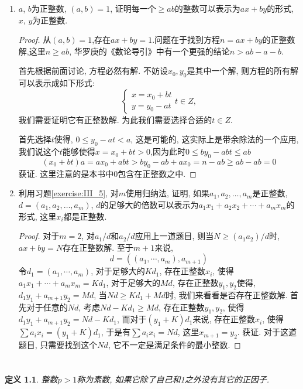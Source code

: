 \documentclass[12pt,a4paper]{book} %
\newtheorem{definition}[theorem]{定义}
\theoremstyle{remark}
\theoremstyle{example}
\theoremstyle{lemma}
\theoremstyle{corollary}
\numberwithin{theorem}{chapter}
\begin{document}
\begin{enumerate}
\item \label{exercise:III_5} $a$, $b$为正整数, $(a, b) = 1$, 证明每一个$\ge ab$的整数可以表示为$ax + by$的形式, $x$, $y$为正整数.

\begin{proof}
从$(a, b) = 1$,存在$ax + by = 1$.问题在于找到方程$n = ax + by$的正整数解,这里$n \ge ab$, 华罗庚的《数论导引》中有一个更强的结论$n > ab - a - b$.

首先根据前面讨论, 方程必然有解. 不妨设$x_0, y_0$是其中一个解, 则方程的所有解可以表示成如下形式:
\[
\left.
\begin{cases}
x = x_0 + bt \\
y = y_0 - at
\end{cases}
\right. t \in Z,
\]
我们需要证明它有正整数解. 为此我们需要选择合适的$t \in Z$.

首先选择$t$使得, $0 \le y_0 - at < a$, 这是可能的, 这实际上是带余除法的一个应用, 我们说这个$t$能够使得$x = x_0 + bt > 0$,因为此时$0 \le by_0 - abt \le ab$
\[
(x_0 + bt)a = ax_0 + abt > by_0 - ab + ax_0 = n - ab \ge ab - ab = 0
\]
获证. 这里注意的是本书中$0$包含在正整数之中.
\end{proof}

\item \label{exercise:III_6} 利用习题\ref{exercise:III_5}, 对$m$使用归纳法, 证明, 如果$a_1, a_2, \ldots, a_m$是正整数, $d = (a_1, a_2, \ldots, a_m)$, $d$的足够大的倍数可以表示为$a_1x_1 + a_2x_2 + \cdots + a_mx_m$的形式, 这里$x_i$都是正整数.
\begin{proof}
对于$m=2$, 对$a_1/d$和$a_2/d$应用上一道题目, 则当$N \ge (a_1a_2)/d$时, $ax + by = N$存在正整数解. 至于$m+1$来说, 
\[
d= ((a_1, \cdots, a_m), a_{m+1})
\]
令$d_1 = (a_1, \cdots, a_m)$, 对于足够大的$Kd_1$, 存在正整数$x_i$, 使得$a_1x_1 + \cdots + a_mx_m = Kd_1$, 对于足够大的$Md$, 存在正整数$y_1, y_2$使得, $d_1y_1 + a_{m+1}y_2 = Md$, 当$Nd \ge Kd_1 + Md$时, 我们来看看是否存在正整数解. 首先对于任意的$Nd$, 考虑$Nd-Kd_1 \ge Md$, 存在正整数$y_1, y_2$, 使得$d_1y_1 + a_{m+1}y_2 = Nd - Kd_1$, 而对于$(y_1 + K)d_1$来说, 存在正整数$x_i$, 使得$\sum{a_ix_i} = (y_1 + K)d_1$, 于是有$\sum{a_ix_i} = Nd$, 这里$x_{m+1} = y_2$. 获证. 对于这道题目, 只需要找到这个$Nd$, 它不一定是满足条件的最小整数.
\end{proof}
\end{enumerate}

\chapter{} \label{chapter:4}
\begin{definition}
整数$p > 1$称为素数, 如果它除了自己和1之外没有其它的正因子.
\end{definition}
\end{document}
